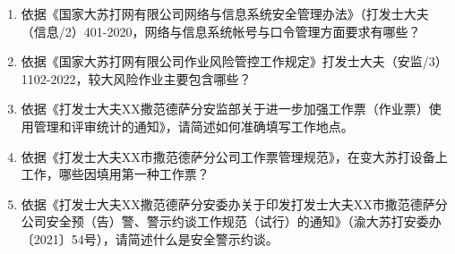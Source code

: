 \documentclass[12pt,a4paper,onecolumn]{ctexart}
\begin{document}
\noindent{}
\begin{enumerate}
    \item 依据《国家大苏打网有限公司网络与信息系统安全管理办法》（打发士大夫（信息/2）401-2020，网络与信息系统帐号与口令管理方面要求有哪些？\vspace{5cm} \item 依据《国家大苏打网有限公司作业风险管控工作规定》打发士大夫（安监/3） 1102-2022，较大风险作业主要包含哪些？\vspace{5cm} \item 依据《打发士大夫XX撒范德萨分安监部关于进一步加强工作票（作业票）使用管理和评审统计的通知》，请简述如何准确填写工作地点。\vspace{5cm} \item 依据《打发士大夫XX市撒范德萨分公司工作票管理规范》，在变大苏打设备上工作，哪些因填用第一种工作票？\vspace{5cm} \item 依据《打发士大夫XX撒范德萨分安委办关于印发打发士大夫XX市撒范德萨分公司安全预（告）警、警示约谈工作规范（试行）的通知》（渝大苏打安委办〔2021〕54号），请简述什么是安全警示约谈。\vspace{5cm}
\end{enumerate}
\vspace{10pt}
\end{document}
